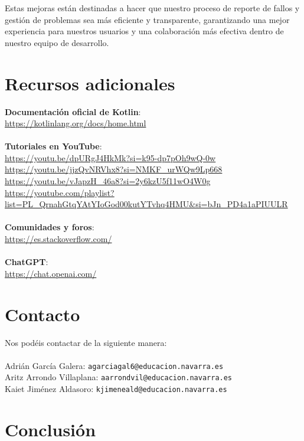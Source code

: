 \documentclass{article}
\begin{document}
    Estas mejoras están destinadas a hacer que nuestro proceso de reporte de fallos y gestión de problemas sea más eficiente y transparente, garantizando una mejor experiencia para nuestros usuarios y una colaboración más efectiva dentro de nuestro equipo de desarrollo.

\section{Recursos adicionales}

    \textbf{Documentación oficial de Kotlin}: \\
    \url{https://kotlinlang.org/docs/home.html} \\
    \\
    \textbf{Tutoriales en YouTube}: \\
    \url{https://youtu.be/dpURgJ4HkMk?si=k95-dp7pOh9wQ-0w} \\
    \url{https://youtu.be/jjzQvNRVhx8?si=NMKF_urWQw9Lp668} \\
    \url{https://youtu.be/vJapzH_46a8?si=2y6kzU5f11wO4W0g} \\
    \url{https://youtube.com/playlist?list=PL_QrnahGtqYAtYIoGod00kutYTvhq4HMU&si=bJn_PD4a1aPIUULR} \\
    \\
    \textbf{Comunidades y foros}: \\
    \url{https://es.stackoverflow.com/} \\
    \\
    \textbf{ChatGPT}: \\
    \url{https://chat.openai.com/}

\section{Contacto}

    Nos podéis contactar de la siguiente manera:
    \\
    \\
    Adrián García Galera: \texttt{agarciagal6@educacion.navarra.es} \\
    Aritz Arrondo Villaplana: \texttt{aarrondvil@educacion.navarra.es} \\
    Kaiet Jiménez Aldasoro: \texttt{kjimeneald@educacion.navarra.es}

\section{Conclusión}
\end{document}
